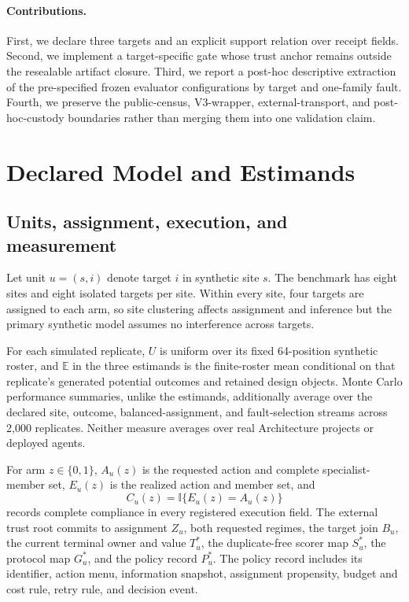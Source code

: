 \documentclass{article}
\newcommand{\E}{\mathbb{E}}
\newcommand{\ind}{\mathbb{I}}
\begin{document}
\paragraph{Contributions.}
First, we declare three targets and an explicit support relation over receipt fields. Second, we implement a target-specific gate whose trust anchor remains outside the resealable artifact closure. Third, we report a post-hoc descriptive extraction of the pre-specified frozen evaluator configurations by target and one-family fault. Fourth, we preserve the public-census, V3-wrapper, external-transport, and post-hoc-custody boundaries rather than merging them into one validation claim.

\section{Declared Model and Estimands}
\label{sec:model}

\subsection{Units, assignment, execution, and measurement}

Let unit $u=(s,i)$ denote target $i$ in synthetic site $s$. The benchmark has eight sites and eight isolated targets per site. Within every site, four targets are assigned to each arm, so site clustering affects assignment and inference but the primary synthetic model assumes no interference across targets.

For each simulated replicate, $U$ is uniform over its fixed 64-position synthetic roster, and $\E$ in the three estimands is the finite-roster mean conditional on that replicate's generated potential outcomes and retained design objects. Monte Carlo performance summaries, unlike the estimands, additionally average over the declared site, outcome, balanced-assignment, and fault-selection streams across 2,000 replicates. Neither measure averages over real Architecture projects or deployed agents.

For arm $z\in\{0,1\}$, $A_u(z)$ is the requested action and complete specialist-member set, $E_u(z)$ is the realized action and member set, and
\begin{equation}
  C_u(z)=\ind\{E_u(z)=A_u(z)\}
\end{equation}
records complete compliance in every registered execution field. The external trust root commits to assignment $Z_u$, both requested regimes, the target join $B_u$, the current terminal owner and value $T_u^*$, the duplicate-free scorer map $S_u^*$, the protocol map $G_u^*$, and the policy record $P_u^*$. The policy record includes its identifier, action menu, information snapshot, assignment propensity, budget and cost rule, retry rule, and decision event.
\end{document}
